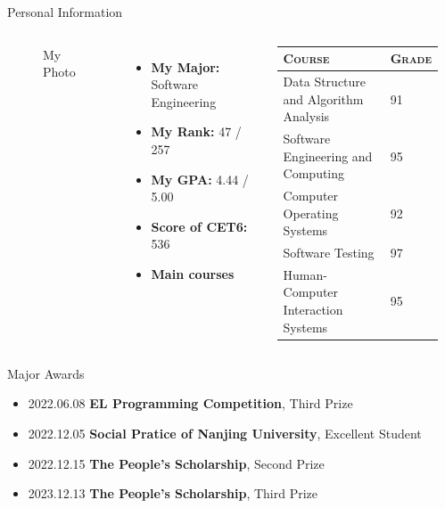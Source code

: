 \documentclass[10pt]{beamer}
\begin{document}
\begin{frame}[fragile]{Personal Information}
\begin{columns}
\begin{figure}
            \caption{My Photo}
            \end{figure}
            \begin{itemize}
                \item \textbf{My Major:} Software Engineering
                \item \textbf{My Rank:} 47 / 257
                \item \textbf{My GPA:} 4.44 / 5.00
                \item \textbf{Score of CET6:} 536
                \item \textbf{Main courses}
            \end{itemize}
               \begin{table}[]
	\centering
	\begin{tabular}{ll}
		\hline
		\textsc{Course} & \textsc{Grade} \\ \hline
		    Data Structure and Algorithm Analysis   &  91     \\ \hline
		  Software Engineering and Computing     &   95    \\ \hline
            Computer Operating Systems     &   92    \\ \hline
            Software Testing     &   97    \\ \hline
            Human-Computer Interaction Systems     &   95    \\ \hline
	\end{tabular}
	\label{tab:my-table}
\end{table}
        \end{columns}
\end{frame}

\begin{frame}[fragile]{Major Awards}
\begin{itemize}
    \item 2022.06.08 \textbf{EL Programming Competition}, Third Prize
    \item 2022.12.05 \textbf{Social Pratice of Nanjing University}, Excellent Student
    \item 2022.12.15 \textbf{The People's Scholarship}, Second Prize
    \item 2023.12.13 \textbf{The People's Scholarship}, Third Prize
\end{itemize}
\end{frame}
\end{document}
